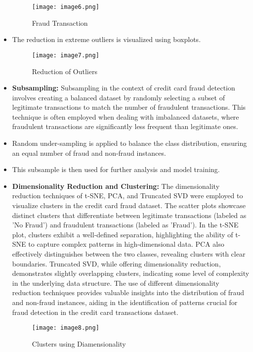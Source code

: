 \begin{itemize}
   \begin{figure}[h]
    \centering
    \texttt{[image: image6.png]}
    \caption{Fraud Transaction}
    \label{fig:enter-label}
\end{figure}

   \item The reduction in extreme outliers is visualized using boxplots.
   
   \begin{figure}[h]
       \centering
       \texttt{[image: image7.png]}
       \caption{Reduction of Outliers}
       \label{fig:enter-label}
   \end{figure}

   \item \textbf{Subsampling:} Subsampling in the context of credit card fraud detection involves creating a balanced dataset by randomly selecting a subset of legitimate transactions to match the number of fraudulent transactions. This technique is often employed when dealing with imbalanced datasets, where fraudulent transactions are significantly less frequent than legitimate ones. 
   \item Random under-sampling is applied to balance the class distribution, ensuring an equal number of fraud and non-fraud instances.
   \item This subsample is then used for further analysis and model training.\medskip
   
  \item \textbf{Dimensionality Reduction and Clustering:} 
The dimensionality reduction techniques of t-SNE, PCA, and Truncated SVD were employed to visualize clusters in the credit card fraud dataset. The scatter plots showcase distinct clusters that differentiate between legitimate transactions (labeled as 'No Fraud') and fraudulent transactions (labeled as 'Fraud'). In the t-SNE plot, clusters exhibit a well-defined separation, highlighting the ability of t-SNE to capture complex patterns in high-dimensional data. PCA also effectively distinguishes between the two classes, revealing clusters with clear boundaries. Truncated SVD, while offering dimensionality reduction, demonstrates slightly overlapping clusters, indicating some level of complexity in the underlying data structure. The use of different dimensionality reduction techniques provides valuable insights into the distribution of fraud and non-fraud instances, aiding in the identification of patterns crucial for fraud detection in the credit card transactions dataset.

\begin{figure}[h]
    \centering
    \texttt{[image: image8.png]}
    \caption{Clusters using Diamensionality}
    \label{fig:enter-label}
\end{figure}

   

\end{itemize}

